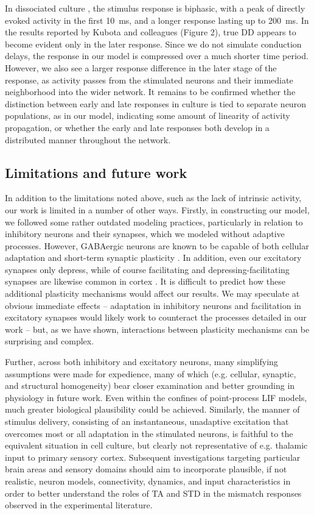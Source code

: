 \documentclass[10pt,letterpaper]{article}
\begin{document}
In dissociated culture \cite{Kubota2021-dx}, the stimulus response is biphasic, with a peak of directly evoked activity in the first \qty{10}{\milli\second}, and a longer response lasting up to \qty{200}{\milli\second}. In the results reported by Kubota and colleagues (Figure 2), true DD appears to become evident only in the later response. Since we do not simulate conduction delays, the response in our model is compressed over a much shorter time period. However, we also see a larger response difference in the later stage of the response, as activity passes from the stimulated neurons and their immediate neighborhood into the wider network. It remains to be confirmed whether the distinction between early and late responses in culture is tied to separate neuron populations, as in our model, indicating some amount of linearity of activity propagation, or whether the early and late responses both develop in a distributed manner throughout the network.

\subsection*{Limitations and future work}

In addition to the limitations noted above, such as the lack of intrinsic activity, our work is limited in a number of other ways.
Firstly, in constructing our model, we followed some rather outdated modeling practices, particularly in relation to inhibitory neurons and their synapses, which we modeled without adaptive processes. However, GABAergic neurons are known to be capable of both cellular adaptation and short-term synaptic plasticity \cite{Perrenoud2013-fo,Markram2004-fb,Gupta2000-jh}. In addition, even our excitatory synapses only depress, while of course facilitating and depressing-facilitating synapses are likewise common in cortex \cite{Tsodyks1997-qt,Varela1997-nr}. It is difficult to predict how these additional plasticity mechanisms would affect our results. We may speculate at obvious immediate effects -- adaptation in inhibitory neurons and facilitation in excitatory synapses would likely work to counteract the processes detailed in our work -- but, as we have shown, interactions between plasticity mechanisms can be surprising and complex.

Further, across both inhibitory and excitatory neurons, many simplifying assumptions were made for expedience, many of which (e.g. cellular, synaptic, and structural homogeneity) bear closer examination and better grounding in physiology in future work. Even within the confines of point-process LIF models, much greater biological plausibility could be achieved.
Similarly, the manner of stimulus delivery, consisting of an instantaneous, unadaptive excitation that overcomes most or all adaptation in the stimulated neurons, is faithful to the equivalent situation in cell culture, but clearly not representative of e.g. thalamic input to primary sensory cortex.
Subsequent investigations targeting particular brain areas and sensory domains should aim to incorporate plausible, if not realistic, neuron models, connectivity, dynamics, and input characteristics in order to better understand the roles of TA and STD in the mismatch responses observed in the experimental literature.
\end{document}
